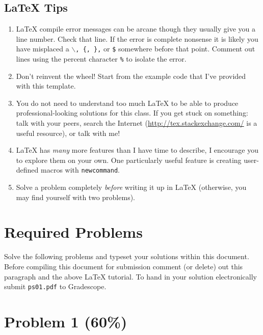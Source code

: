 \documentclass[11pt]{article}
\theoremstyle{nonumberplain}
\begin{document}
\subsection*{\LaTeX{} Tips}

\begin{enumerate}
\item \LaTeX{} compile error messages can be arcane though they
  usually give you a line number.  Check that line.  If the error is
  complete nonsense it is likely you have misplaced a
  \texttt{$\backslash$, \{, \},} or \texttt{\$} somewhere before that
  point.  Comment out lines using the percent character \texttt{\%} to
  isolate the error.
\item Don't reinvent the wheel!  Start from the example code that I've
  provided with this template.  
\item You do not need to understand too much \LaTeX{} to be able to
  produce professional-looking solutions for this class.  If you get
  stuck on something: talk with your peers, search the Internet
  (\url{http://tex.stackexchange.com/} is a useful resource), or talk
  with me!
\item \LaTeX{} has \emph{many} more features than I have time to describe, I
  encourage you to explore them on your own.  One particularly useful
  feature is creating user-defined macros with \texttt{newcommand}.
\item Solve a problem completely \emph{before} writing it up in
  \LaTeX{} (otherwise, you may find yourself with two problems).
\end{enumerate}

\pagebreak


\section*{Required Problems}

\noindent Solve the following problems and typeset your solutions
within this document.  Before compiling this document for submission
comment (or delete) out this paragraph and the above \LaTeX{}
tutorial.  To hand in your solution electronically submit
\texttt{ps01.pdf} to Gradescope.


\section*{Problem 1 (60\%)}
\end{document}

